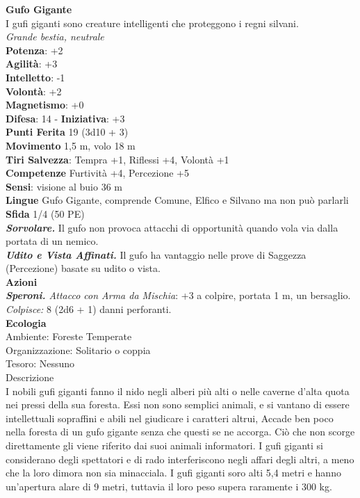 \begin{multicols}{2}
\medskip\textbf{Gufo Gigante}\\
I gufi giganti sono creature intelligenti che proteggono i regni silvani.\\
\emph{Grande bestia, neutrale}\\
\textbf{Potenza}: +2\\
\textbf{Agilità}: +3\\
\textbf{Intelletto}: -1\\
\textbf{Volontà}: +2\\
\textbf{Magnetismo}: +0\\
\textbf{Difesa}: 14 - \textbf{Iniziativa}: +3\\
\textbf{Punti Ferita} 19 (3d10 + 3)\\
\textbf{Movimento} 1,5 m, volo 18 m\\
\textbf{Tiri Salvezza}: Tempra +1, Riﬂessi +4, Volontà +1 \\
\textbf{Competenze} Furtività +4, Percezione +5\\
\textbf{Sensi}: visione al buio 36 m\\
\textbf{Lingue} Gufo Gigante, comprende Comune, Elfico e Silvano ma non può parlarli\\
\textbf{Sfida} 1/4 (50 PE)\smallskip\\
\emph{\textbf{Sorvolare.}} Il gufo non provoca attacchi di opportunità quando vola via dalla portata di un nemico.\\
\emph{\textbf{Udito e Vista Affinati.}} Il gufo ha vantaggio nelle prove di Saggezza (Percezione) basate su udito o vista.\\
\smallskip\textbf{Azioni}\\
\emph{\textbf{Speroni.} Attacco con Arma da Mischia}: +3 a colpire, portata 1 m, un bersaglio.\\
\emph{Colpisce:} 8 (2d6 + 1) danni perforanti.\\
\textbf{Ecologia}\\
Ambiente: Foreste Temperate\\
Organizzazione: Solitario o coppia\\
Tesoro: Nessuno\\
Descrizione\\

I nobili gufi giganti fanno il nido negli alberi più alti o nelle caverne d'alta quota nei pressi della sua foresta. Essi non sono semplici animali, e si vantano di essere intellettuali sopraffini e abili nel giudicare i caratteri altrui, Accade ben poco nella foresta di un gufo gigante senza che questi se ne accorga. Ciò che non scorge direttamente gli viene riferito dai suoi animali informatori. I gufi giganti si considerano degli spettatori e di rado interferiscono negli affari degli altri, a meno che la loro dimora non sia minacciala. I gufi giganti soro alti 5,4 metri e hanno un'apertura alare di 9 metri, tuttavia il loro peso supera raramente i 300 kg. \\



\end{multicols}
